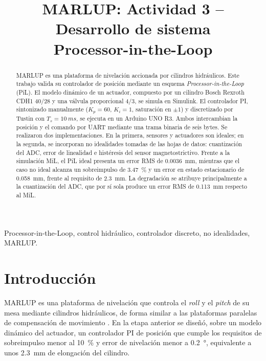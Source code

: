 \documentclass[conference]{IEEEtran}
\begin{document}
\title{MARLUP: Actividad 3 -- Desarrollo de sistema\\Processor-in-the-Loop}

\author{
}

\maketitle

\begin{abstract}
MARLUP es una plataforma de nivelación accionada por cilindros hidráulicos. Este trabajo valida su controlador de posición mediante un esquema \textit{Processor-in-the-Loop} (PiL). El modelo dinámico de un actuador, compuesto por un cilindro Bosch Rexroth CDH1 40/28 y una válvula proporcional 4/3, se simula en Simulink. El controlador PI, sintonizado manualmente ($K_p=60$, $K_i=1$, saturación en $\pm1$) y discretizado por Tustin con $T_s=\SI{10}{ms}$, se ejecuta en un Arduino UNO R3. Ambos intercambian la posición y el comando por UART mediante una trama binaria de seis bytes. Se realizaron dos implementaciones. En la primera, sensores y actuadores son ideales; en la segunda, se incorporan no idealidades tomadas de las hojas de datos: cuantización del ADC, error de linealidad e histéresis del sensor magnetostrictivo. Frente a la simulación MiL, el PiL ideal presenta un error RMS de \SI{0.0036}{mm}, mientras que el caso no ideal alcanza un sobreimpulso de \SI{3.47}{\percent} y un error en estado estacionario de \SI{0.058}{mm}, frente al requisito de \SI{2.3}{mm}. La degradación se atribuye principalmente a la cuantización del ADC, que por sí sola produce un error RMS de \SI{0.113}{mm} respecto al MiL.
\end{abstract}

\begin{IEEEkeywords}
Processor-in-the-Loop, control hidráulico, controlador discreto, no idealidades, MARLUP.
\end{IEEEkeywords}

\section{Introducción}
MARLUP es una plataforma de nivelación que controla el \textit{roll} y el \textit{pitch} de su mesa mediante cilindros hidráulicos, de forma similar a las plataformas paralelas de compensación de movimiento \cite{wang2025}. En la etapa anterior se diseñó, sobre un modelo dinámico del actuador, un controlador PI de posición que cumple los requisitos de sobreimpulso menor al \SI{10}{\percent} y error de nivelación menor a \SI{0.2}{\degree}, equivalente a unos \SI{2.3}{mm} de elongación del cilindro.
\end{document}
